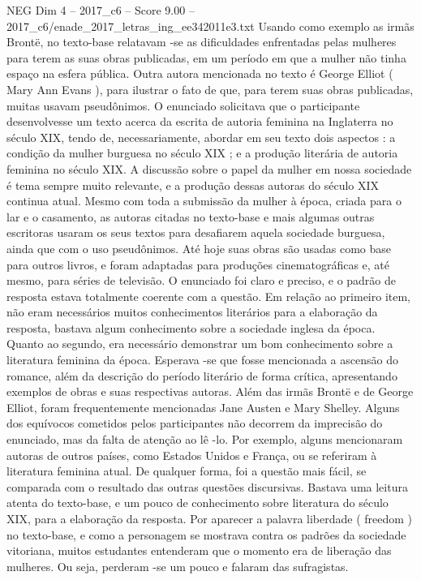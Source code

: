 \begin{textsample}{NEG Dim 4 – 2017\_c6 – Score 9.00 – 2017\_c6/enade\_2017\_letras\_ing\_ee342011e3.txt}
Usando como exemplo as irmãs Brontë, no texto-base relatavam -se as dificuldades enfrentadas pelas mulheres para terem as suas obras publicadas, em um período em que a mulher não tinha espaço na esfera pública.
Outra autora mencionada no texto é George Elliot ( Mary Ann Evans ), para ilustrar o fato de que, para terem suas obras publicadas, muitas usavam pseudônimos.
O enunciado solicitava que o participante desenvolvesse um texto acerca da escrita de autoria feminina na Inglaterra no século XIX, tendo de, necessariamente, abordar em seu texto dois aspectos : a condição da mulher burguesa no século XIX ; e a produção literária de autoria feminina no século XIX.
A discussão sobre o papel da mulher em nossa sociedade é tema sempre muito relevante, e a produção dessas autoras do século XIX continua atual.
Mesmo com toda a submissão da mulher à época, criada para o lar e o casamento, as autoras citadas no texto-base e mais algumas outras escritoras usaram os seus textos para desafiarem aquela sociedade burguesa, ainda que com o uso pseudônimos.
Até hoje suas obras são usadas como base para outros livros, e foram adaptadas para produções cinematográficas e, até mesmo, para séries de televisão.
O enunciado foi claro e preciso, e o padrão de resposta estava totalmente coerente com a questão.
Em relação ao primeiro item, não eram necessários muitos conhecimentos literários para a elaboração da resposta, bastava algum conhecimento sobre a sociedade inglesa da época.
Quanto ao segundo, era necessário demonstrar um bom conhecimento sobre a literatura feminina da época.
Esperava -se que fosse mencionada a ascensão do romance, além da descrição do período literário de forma crítica, apresentando exemplos de obras e suas respectivas autoras.
Além das irmãs Brontë e de George Elliot, foram frequentemente mencionadas Jane Austen e Mary Shelley.
Alguns dos equívocos cometidos pelos participantes não decorrem da imprecisão do enunciado, mas da falta de atenção ao lê -lo.
Por exemplo, alguns mencionaram autoras de outros países, como Estados Unidos e França, ou se referiram à literatura feminina atual.
De qualquer forma, foi a questão mais fácil, se comparada com o resultado das outras questões discursivas.
Bastava uma leitura atenta do texto-base, e um pouco de conhecimento sobre literatura do século XIX, para a elaboração da resposta.
Por aparecer a palavra liberdade ( freedom ) no texto-base, e como a personagem se mostrava contra os padrões da sociedade vitoriana, muitos estudantes entenderam que o momento era de liberação das mulheres.
Ou seja, perderam -se um pouco e falaram das sufragistas.

\end{textsample}
